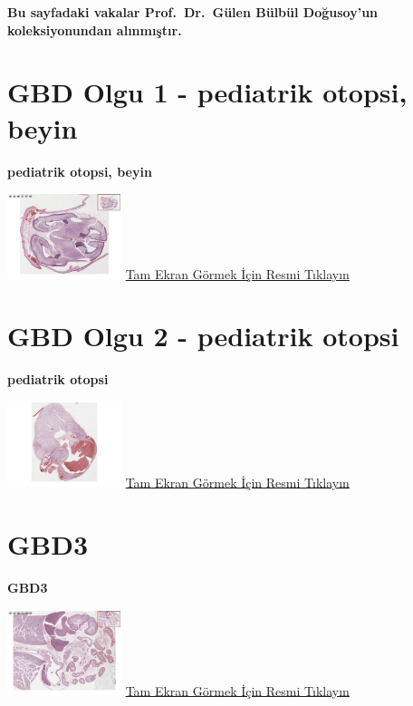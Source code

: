 \documentclass[
  letterpaper,
  DIV=11,
  numbers=noendperiod]{scrreprt}
\begin{document}
\textbf{Bu sayfadaki vakalar Prof.~Dr.~Gülen Bülbül Doğusoy'un
koleksiyonundan alınmıştır.}

\hypertarget{sec-GBD1}{%
\section{GBD Olgu 1 - pediatrik otopsi, beyin}\label{sec-GBD1}}

\textbf{pediatrik otopsi, beyin}

\href{https://images.patolojiatlasi.com/GBD1/HE.html}{\includegraphics[width=0.25\textwidth,height=\textheight]{./screenshots/GBD1_screenshot.png}}
\href{https://images.patolojiatlasi.com/GBD1/HE.html}{Tam Ekran Görmek
İçin Resmi Tıklayın}

\hypertarget{sec-GBD2}{%
\section{GBD Olgu 2 - pediatrik otopsi}\label{sec-GBD2}}

\textbf{pediatrik otopsi}

\href{https://images.patolojiatlasi.com/GBD2/HE.html}{\includegraphics[width=0.25\textwidth,height=\textheight]{./screenshots/GBD2_screenshot.png}}
\href{https://images.patolojiatlasi.com/GBD2/HE.html}{Tam Ekran Görmek
İçin Resmi Tıklayın}

\hypertarget{sec-GBD3}{%
\section{GBD3}\label{sec-GBD3}}

\textbf{GBD3}

\href{https://images.patolojiatlasi.com/GBD3/HE.html}{\includegraphics[width=0.25\textwidth,height=\textheight]{./screenshots/GBD3_screenshot.png}}
\href{https://images.patolojiatlasi.com/GBD3/HE.html}{Tam Ekran Görmek
İçin Resmi Tıklayın}
\end{document}
